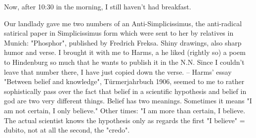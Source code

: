 Now, after 10:30 in the morning, I still haven't had breakfast.

Our landlady gave me two numbers of an Anti-Simplicissimus, the anti-radical satirical paper in Simplicissimus form which were sent to her by relatives in Munich: "Phosphor", published by Fredrich Freksa. Shiny drawings, also sharp humor and verse. I brought it with me to Harms, a he liked (rightly so) a poem to Hindenburg so much that he wants to publish it in the N.N. Since I couldn't leave that number there, I have just copied down the verse. -- Harms' essay "Between belief and knowledge", Türmerjahrbuch 1906, seemed to me to rather sophistically pass over the fact that belief in a scientific hypothesis and belief in god are two very different things. Belief has two meanings. Sometimes it means "I am not certain, I only believe." Other times: "I am more than certain, I believe. The actual scientist knows the hypothesis only as regards the first "I believe" = dubito, not at all the second, the "credo".

